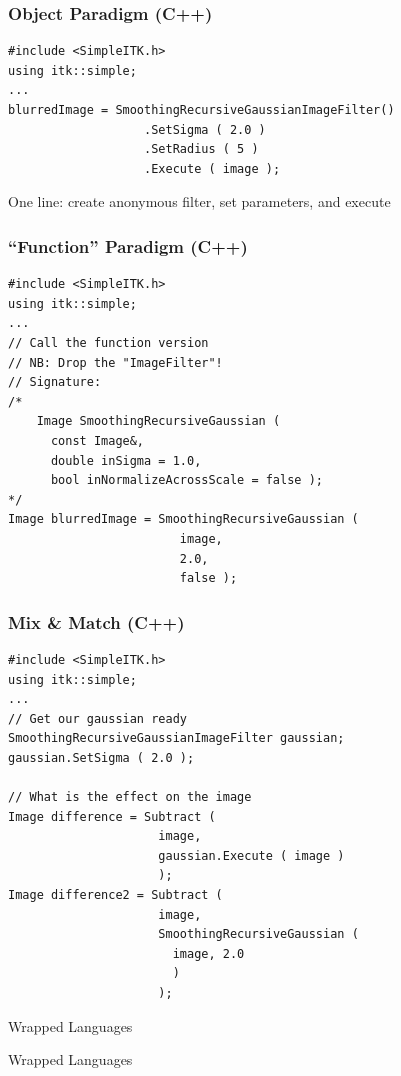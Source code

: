 \begin{frame}[fragile]
\frametitle{Object Paradigm (C++)}
\lstcpp
\begin{lstlisting}
#include <SimpleITK.h>
using itk::simple;
...
blurredImage = SmoothingRecursiveGaussianImageFilter()
                   .SetSigma ( 2.0 )
                   .SetRadius ( 5 )
                   .Execute ( image );
\end{lstlisting}
One line: create anonymous filter, set parameters, and execute
\end{frame}

\begin{frame}[fragile]
\frametitle{``Function'' Paradigm (C++)}
\lstcpp
\begin{lstlisting}
#include <SimpleITK.h>
using itk::simple;
...
// Call the function version
// NB: Drop the "ImageFilter"!
// Signature:
/*
    Image SmoothingRecursiveGaussian (
      const Image&,
      double inSigma = 1.0,
      bool inNormalizeAcrossScale = false );
*/
Image blurredImage = SmoothingRecursiveGaussian (
                        image,
                        2.0,
                        false );
\end{lstlisting}
\end{frame}

\begin{frame}[fragile]
\frametitle{Mix \& Match (C++)}
\lstcpp
\begin{lstlisting}
#include <SimpleITK.h>
using itk::simple;
...
// Get our gaussian ready
SmoothingRecursiveGaussianImageFilter gaussian;
gaussian.SetSigma ( 2.0 );

// What is the effect on the image
Image difference = Subtract (
                     image,
                     gaussian.Execute ( image )
                     );
Image difference2 = Subtract (
                     image,
                     SmoothingRecursiveGaussian (
                       image, 2.0
                       )
                     );

\end{lstlisting}
\end{frame}


\begin{frame}{Wrapped Languages}
\fontsize{36pt}{36pt}\selectfont
\center
\begin{center}
Wrapped Languages
\end{center}
\end{frame}


